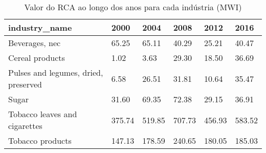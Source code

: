\begin{table}
\centering
\caption{Valor do RCA ao longo dos anos para cada indústria (MWI)}
\begin{tabular}{p{6cm}p{1.5cm}p{1.5cm}p{1.5cm}p{1.5cm}p{1.5cm}}
\toprule
                       industry\_name &   2000 &   2004 &   2008 &   2012 &   2016 \\
\midrule
                      Beverages, nec &  65.25 &  65.11 &  40.29 &  25.21 &  40.47 \\
                     Cereal products &   1.02 &   3.63 &  29.30 &  18.50 &  36.69 \\
Pulses and legumes, dried, preserved &   6.58 &  26.51 &  31.81 &  10.64 &  35.47 \\
                               Sugar &  31.60 &  69.35 &  72.38 &  29.15 &  36.91 \\
       Tobacco leaves and cigarettes & 375.74 & 519.85 & 707.73 & 456.93 & 583.52 \\
                    Tobacco products & 147.13 & 178.59 & 240.65 & 180.05 & 185.03 \\
\bottomrule
\end{tabular}
\end{table}
